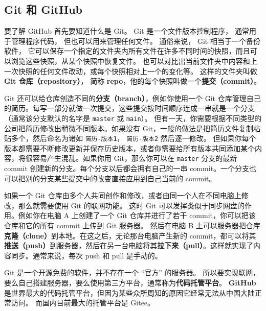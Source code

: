 

\subsection{Git 和 GitHub}
要了解 GitHub 首先要知道什么是 Git。 Git 是一个文件版本控制程序， 通常用于管理程序代码， 但也可以用来管理任何文件。 通俗来说， Git 相当于一个备份软件， 它可以保存一个指定的文件夹内所有文件在许多不同时间的快照，而且可以浏览这些快照，从某个快照中恢复文件。 也可以对比出当前文件夹中内容和上一次快照的任何文件改动，或每个快照相对上一个的变化等。 这样的文件夹叫做 \textbf{Git 仓库（repository）}， 简称 \textbf{repo}，他的每个快照叫做一个\textbf{提交（commit）}。


Git 还可以给仓库创造不同的\textbf{分支（branch）}，例如你使用一个 Git 仓库管理自己的简历。每写一部分就做一次提交，这些提交按时间顺序连成一串就是一个分支（通常该分支默认的名字是 \verb`master` 或 \verb`main`）。 但有一天，你需要根据不同类型的公司把简历修改出稍微不同版本。如果没有 Git，一般的做法是把简历文件复制粘贴多个，然后命名为诸如 \verb`简历-版本1`， \verb`简历-版本2` 然后逐一修改。 但如果你每个版本都需要不断修改更新并保存历史版本，或者你需要给所有版本共同添加某个内容，将很容易产生混乱。如果你用 Git，那么你可以在 \verb`master` 分支的最新 commit 创建新的分支。每个分支以后都会拥有自己的一串 commit。一个分支也可以把别的分支某些提交中的改变直接应用到自己当前的 commit。

如果一个 Git 仓库由多个人共同创作和修改，或者由同一个人在不同电脑上修改，那么就需要使用 Git 的联网功能。 这时 Git 可以发挥类似于同步网盘的作用。例如你在电脑 A 上创建了一个 Git 仓库并进行了若干 commit，你可以把该仓库和它的所有 commit 上传到 Git 服务器。 然后在电脑 B 上可以服务器把仓库\textbf{克隆（clone）}到本地。在这之后，无论那台电脑产生新的 commit，都可以将其\textbf{推送（push）}到服务器，然后在另一台电脑将其\textbf{拉下来（pull）}。这样就实现了内容同步。通常来说，每次 push 和 pull 是手动的。

Git 是一个开源免费的软件，并不存在一个 “官方” 的服务器。 所以要实现联网，要么自己搭建服务器，要么使用第三方平台，通常称为\textbf{代码托管平台}。 \textbf{GitHub} 是世界最大的代码托管平台，但因为某些众所周知的原因它经常无法从中国大陆正常访问。 而国内目前最大的托管平台是 Gitee。

